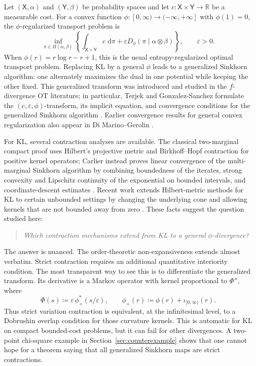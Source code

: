\documentclass[11pt]{article}
\newcommand{\R}{\mathbb{R}}
\newcommand{\X}{\mathsf{X}}
\newcommand{\Y}{\mathsf{Y}}
\newcommand{\eps}{\varepsilon}
\newcommand{\dd}{\,\mathrm{d}}
\newcommand{\defeq}{\coloneqq}
\begin{document}
Let $(\X,\alpha)$ and $(\Y,\beta)$ be probability spaces and let
$c:\X\times\Y\to\R$ be a measurable cost.  For a convex function
$\phi:[0,\infty)\to(-\infty,+\infty]$ with $\phi(1)=0$, the
$\phi$-regularized transport problem is
\begin{equation}\label{eq:primal}
  \inf_{\pi\in\Pi(\alpha,\beta)}
  \left\{
  \int_{\X\times\Y} c\,\dd\pi
  +\eps D_\phi(\pi\mid \alpha\otimes\beta)
  \right\},
  \qquad \eps>0.
\end{equation}
When $\phi(r)=r\log r-r+1$, this is the usual entropy-regularized optimal
transport problem.  Replacing KL by a general $\phi$ leads to a generalized
Sinkhorn algorithm: one alternately maximizes the dual in one potential while
keeping the other fixed.  This generalized transform was introduced and
studied in the $f$-divergence OT literature; in particular, Terjek and
Gonzalez-Sanchez formulate the $(c,\eps,\phi)$-transform, its implicit equation,
and convergence conditions for the generalized Sinkhorn algorithm
\cite{terjek2022}.  Earlier convergence results for general convex
regularization also appear in Di Marino--Gerolin \cite{dimarino2020}.

For KL, several contraction analyses are available.  The classical two-marginal
compact proof uses Hilbert's projective metric and Birkhoff--Hopf contraction
for positive kernel operators; Carlier instead proves linear convergence of the
multi-marginal Sinkhorn algorithm by combining boundedness of the iterates,
strong convexity and Lipschitz continuity of the exponential on bounded
intervals, and coordinate-descent estimates \cite{carlier2022}.  Recent work
extends Hilbert-metric methods for KL to certain unbounded settings by changing
the underlying cone and allowing kernels that are not bounded away from zero
\cite{eckstein2025}.  These facts suggest the question studied here:

\begin{quote}
\emph{Which contraction mechanisms extend from KL to a general
$\phi$-divergence?}
\end{quote}

The answer is nuanced.  The order-theoretic non-expansiveness extends almost
verbatim.  Strict contraction requires an additional quantitative interiority
condition.  The most transparent way to see this is to differentiate the
generalized transform.  Its derivative is a Markov operator with kernel
proportional to $\Phi''$, where
\begin{equation}\label{eq:Phi}
  \Phi(s) \defeq \eps\,\phi_+^*(s/\eps),
  \qquad
  \phi_+(r)\defeq \phi(r)+\iota_{[0,\infty)}(r).
\end{equation}
Thus strict variation contraction is equivalent, at the infinitesimal level, to
a Dobrushin overlap condition for those curvature kernels.  This is automatic
for KL on compact bounded-cost problems, but it can fail for other divergences.
A two-point chi-square example in Section~\ref{sec:counterexample} shows that
one cannot hope for a theorem saying that all generalized Sinkhorn maps are
strict contractions.
\end{document}
